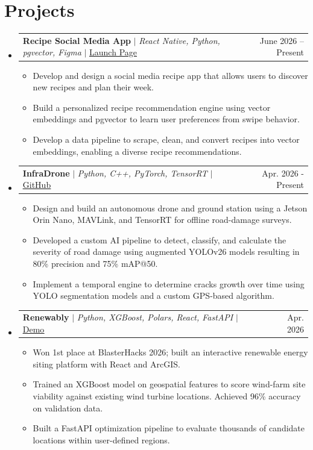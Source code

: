 \documentclass[letterpaper,10pt]{article}
\makeatletter
\newcommand{\resumeItem}[1]{
  \item\small{
    {#1 \vspace{-2pt}}
  }
}
\newcommand{\resumeProjectHeading}[2]{
    \item
    \begin{tabular*}{0.97\textwidth}{l@{\extracolsep{\fill}}r}
      \small#1 & #2 \\
    \end{tabular*}\vspace{-7pt}
}
\newcommand{\resumeSubHeadingListStart}{\begin{itemize}[leftmargin=0.15in, label={}]}
\newcommand{\resumeSubHeadingListEnd}{\end{itemize}}
\newcommand{\resumeItemListStart}{\begin{itemize}}
\newcommand{\resumeItemListEnd}{\end{itemize}\vspace{-5pt}}
\makeatother
\begin{document}
\section{Projects}
    \resumeSubHeadingListStart
      \resumeProjectHeading
          {\textbf{Recipe Social Media App} $|$ \emph{React Native, Python, pgvector, Figma} $|$ \href{https://plateapp.framer.website/}{\underline{Launch Page}}}{June 2026 -- Present}
          \resumeItemListStart
            \resumeItem{Develop and design a social media recipe app that allows users to discover new recipes and plan their week.}
            \resumeItem{Build a personalized recipe recommendation engine using vector embeddings and pgvector to learn user preferences from swipe behavior.}
            \resumeItem{Develop a data pipeline to scrape, clean, and convert recipes into vector embeddings, enabling a diverse recipe recommendations.}
          \resumeItemListEnd
    \resumeProjectHeading
          {\textbf{InfraDrone} $|$ \emph{Python, C++, PyTorch, TensorRT} $|$ \href{https://github.com/Luke-Pitstick/InfraDrone}{\underline{GitHub}}}{Apr. 2026 - Present}
          \resumeItemListStart
              \resumeItem{Design and build an autonomous drone and ground station using a Jetson Orin Nano, MAVLink, and TensorRT for offline road-damage surveys.}
            \resumeItem{Developed a custom AI pipeline to detect, classify, and calculate the severity of road damage using augmented YOLOv26 models resulting in 80\% precision and 75\% mAP@50.}
            \resumeItem{Implement a temporal engine to determine cracks growth over time using YOLO segmentation models and a custom GPS-based algorithm.}
          \resumeItemListEnd
      \resumeProjectHeading
          {\textbf{Renewably} $|$ \emph{Python, XGBoost, Polars, React, FastAPI} $|$ \href{https://renewably-wind.onrender.com/}{{\underline{Demo}}}}{Apr. 2026}
          \resumeItemListStart
            \resumeItem{Won 1st place at BlasterHacks 2026; built an interactive renewable energy siting platform with React and ArcGIS.}
            \resumeItem{Trained an XGBoost model on geospatial features to score wind-farm site viability against existing wind turbine locations. Achieved 96\% accuracy on validation data.}
            \resumeItem{Built a FastAPI optimization pipeline to evaluate thousands of candidate locations within user-defined regions.}
          \resumeItemListEnd
      
      
    \resumeSubHeadingListEnd

\end{document}
